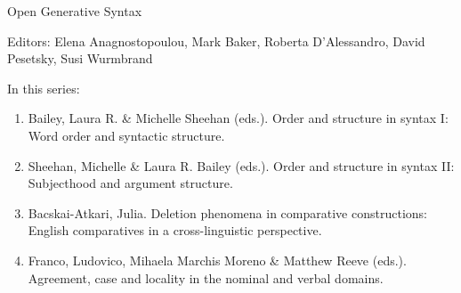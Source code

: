 {\large Open Generative Syntax}

\bigskip

Editors:   Elena Anagnostopoulou,
    Mark Baker,
    Roberta D’Alessandro,
    David Pesetsky,
    Susi Wurmbrand


\bigskip

In this series:

\begin{enumerate}
\item Bailey, Laura R. \& Michelle Sheehan (eds.). Order and structure in syntax I: Word order and syntactic structure.
\item Sheehan, Michelle \& Laura R. Bailey (eds.).  Order and structure in syntax II: Subjecthood and argument structure.
\item Bacskai-Atkari, Julia. Deletion phenomena in comparative constructions: English comparatives in a cross-linguistic perspective.
\item Franco, Ludovico, Mihaela Marchis Moreno \& Matthew Reeve (eds.). Agreement, case and locality in the nominal and verbal domains.
\end{enumerate}



\vfill

